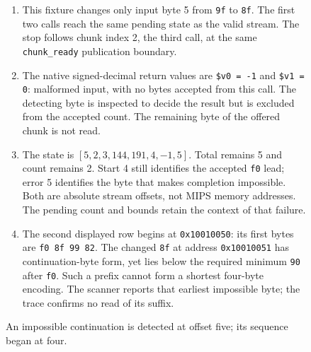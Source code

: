 \begin{figure}[htbp]
  \par\smallskip
  \begin{minipage}{\linewidth}
    \small
    \begin{enumerate}
      \setlength{\itemsep}{2pt}
            \setlength{\parsep}{0pt}
      \item This fixture changes only input byte 5 from \texttt{9f} to \texttt{8f}. The first two calls reach the same pending state as the valid stream. The stop follows chunk index 2, the third call, at the same \texttt{chunk\_ready} publication boundary.
      \item The native signed-decimal return values are \texttt{\$v0 = -1} and \texttt{\$v1 = 0}: malformed input, with no bytes accepted from this call. The detecting byte is inspected to decide the result but is excluded from the accepted count. The remaining byte of the offered chunk is not read.
      \item The state is $[5,2,3,144,191,4,-1,5]$. Total remains 5 and count remains 2. Start 4 still identifies the accepted \texttt{f0} lead; error 5 identifies the byte that makes completion impossible. Both are absolute stream offsets, not MIPS memory addresses. The pending count and bounds retain the context of that failure.
      \item The second displayed row begins at \texttt{0x10010050}: its first bytes are \texttt{f0 8f 99 82}. The changed \texttt{8f} at address \texttt{0x10010051} has continuation-byte form, yet lies below the required minimum \texttt{90} after \texttt{f0}. Such a prefix cannot form a shortest four-byte encoding. The scanner reports that earliest impossible byte; the trace confirms no read of its suffix.
    \end{enumerate}
  \end{minipage}
  \caption{An impossible continuation is detected at offset five; its sequence began at four.}
  \label{capture:015-utf8-scanner-f03-malformed}
  \label{utf8-f03-malformed}
\end{figure}
\par
